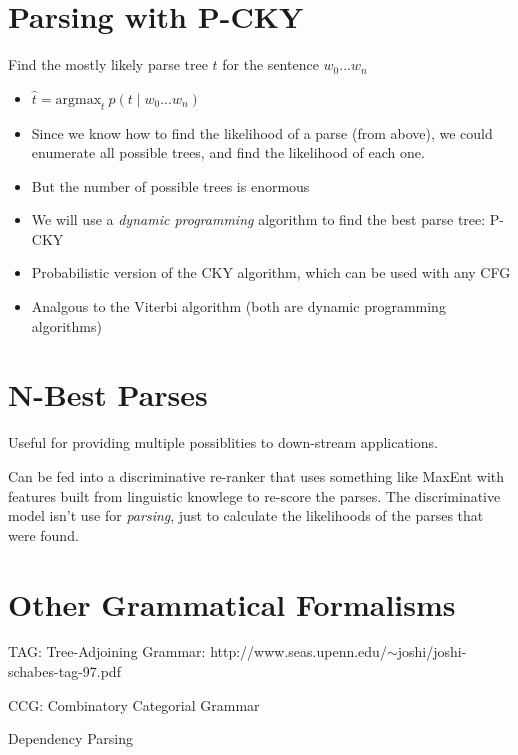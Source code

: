 \documentclass[11pt,letterpaper]{article}
\begin{document}
\section{Parsing with P-CKY}

Find the mostly likely parse tree $t$ for the sentence $w_0...w_n$
\begin{itemize}
  \item $ \hat{t} = \text{argmax}_t~p(t \mid w_0...w_n) $
  \item Since we know how to find the likelihood of a parse (from above), we could enumerate all possible trees, and find the likelihood of each one.
  \item But the number of possible trees is enormous
  \item We will use a \textit{dynamic programming} algorithm to find the best parse tree: P-CKY
  \item Probabilistic version of the CKY algorithm, which can be used with any CFG
  \item Analgous to the Viterbi algorithm (both are dynamic programming algorithms)
\end{itemize}


\section{N-Best Parses}

Useful for providing multiple possiblities to down-stream applications.

Can be fed into a discriminative re-ranker that uses something like MaxEnt with features built from linguistic knowlege to re-score the parses.  The discriminative model isn't use for \textit{parsing}, just to calculate the likelihoods of the parses that were found.




\section{Other Grammatical Formalisms}

TAG: Tree-Adjoining Grammar: http://www.seas.upenn.edu/$\sim$joshi/joshi-schabes-tag-97.pdf

CCG: Combinatory Categorial Grammar

Dependency Parsing
\end{document}
